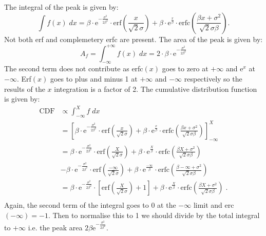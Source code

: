\documentclass[a4paper,10pt]{article}
\begin{document}
The integral of the peak is given by:
\begin{equation}
\int f(x)\;dx = 
\beta\cdot
\mathrm{e}^{-\frac{\sigma^2}{2\beta^2}}
\cdot
\mathrm{erf}\left(\frac{x}{\sqrt{2}\sigma}\right)
+
\beta\cdot
\mathrm{e}^{\frac{x}{\beta}}
\cdot
\mathrm{erfc}\left(\frac{\beta x+\sigma^2}{\sqrt{2}\sigma\beta}\right).
\end{equation}
Not both erf and complemetery erfc are present. The area of the peak is given by:
\begin{equation}
A_f = \int_{-\infty}^{+\infty} f(x)\;dx =
2\cdot \beta\cdot \mathrm{e}^{-\frac{\sigma^2}{2\beta^2}}
\end{equation}
The second term does not contribute as erfc$(x)$ goes to zero at $+\infty$ and e$^x$ at $-\infty$.
Erf$(x)$ goes to plus and minus 1 at $+\infty$ and $-\infty$ respectively so the results of the $x$ integration is a factor of 2.
The cumulative distribution function is given by:
\begin{equation}
\begin{split}
\mathrm{CDF}& \propto \int_{-\infty}^{X} f\;dx \\
&=\left[
\beta\cdot
\mathrm{e}^{-\frac{\sigma^2}{2\beta^2}}
\cdot
\mathrm{erf}\left(\frac{x}{\sqrt{2}\sigma}\right)
+
\beta\cdot
\mathrm{e}^{\frac{x}{\beta}}
\cdot
\mathrm{erfc}\left(\frac{\beta x+\sigma^2}{\sqrt{2}\sigma\beta}\right)\right]_{-\infty}^{X} \\
&=
\beta\cdot
\mathrm{e}^{-\frac{\sigma^2}{2\beta^2}}
\cdot
\mathrm{erf}\left(\frac{X}{\sqrt{2}\sigma}\right)
+
\beta\cdot
\mathrm{e}^{\frac{X}{\beta}}
\cdot
\mathrm{erfc}\left(\frac{\beta X+\sigma^2}{\sqrt{2}\sigma\beta}\right) \\
&-
\beta\cdot
\mathrm{e}^{-\frac{\sigma^2}{2\beta^2}}
\cdot
\mathrm{erf}\left(\frac{-\infty}{\sqrt{2}\sigma}\right)
+
\beta\cdot
\mathrm{e}^{\frac{-\infty}{\beta}}
\cdot
\mathrm{erfc}\left(\frac{\beta -\infty+\sigma^2}{\sqrt{2}\sigma\beta}\right) \\
&=
\beta\cdot
\mathrm{e}^{-\frac{\sigma^2}{2\beta^2}}
\cdot\left[
\mathrm{erf}\left(\frac{X}{\sqrt{2}\sigma}\right)+1\right]
+
\beta\cdot
\mathrm{e}^{\frac{X}{\beta}}
\cdot
\mathrm{erfc}\left(\frac{\beta X+\sigma^2}{\sqrt{2}\sigma\beta}\right)\;. \\
\end{split}
\end{equation}
Again, the second term of the integral goes to 0 at the $-\infty$ limit and erc$(-\infty)=-1$.
Then to normalise this to 1 we should divide by the total integral to $+\infty$ i.e. the peak area $2\beta\mathrm{e}^{-\frac{\sigma^2}{2\beta^2}}$.
\end{document}
